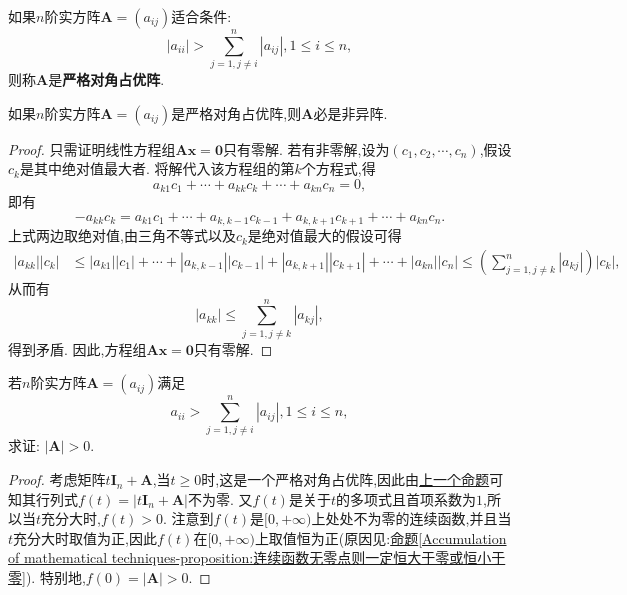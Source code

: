\documentclass[lang=cn,newtx,10pt,scheme=chinese]{elegantbook}
\begin{document}
\begin{definition}[严格对角占优阵]\label{definition:严格对角占优阵}
    如果\(n\)阶实方阵\(\boldsymbol{A}=(a_{ij})\)适合条件:
\[
|a_{ii}|>\sum_{j = 1,j\neq i}^{n}|a_{ij}|,1\leq i\leq n,
\]
则称\(\boldsymbol{A}\)是\textbf{严格对角占优阵}.
\end{definition}

\begin{proposition}[严格对角占优阵必是非异阵]\label{proposition:严格对角占优阵必是非异阵}
    如果\(n\)阶实方阵\(\boldsymbol{A}=(a_{ij})\)是严格对角占优阵,则\(\boldsymbol{A}\)必是非异阵.
\end{proposition}
\begin{proof}
只需证明线性方程组\(\boldsymbol{A}\boldsymbol{x}=\boldsymbol{0}\)只有零解. 若有非零解,设为\((c_1,c_2,\cdots,c_n)\),假设\(c_k\)是其中绝对值最大者. 将解代入该方程组的第\(k\)个方程式,得
\[
a_{k1}c_1+\cdots + a_{kk}c_k+\cdots + a_{kn}c_n = 0,
\]
即有
\[
-a_{kk}c_k=a_{k1}c_1+\cdots + a_{k,k - 1}c_{k - 1}+a_{k,k + 1}c_{k + 1}+\cdots + a_{kn}c_n.
\]
上式两边取绝对值,由三角不等式以及\(c_k\)是绝对值最大的假设可得
\begin{align*}
|a_{kk}||c_k|&\leq|a_{k1}||c_1|+\cdots + |a_{k,k - 1}||c_{k - 1}|+|a_{k,k + 1}||c_{k + 1}|+\cdots + |a_{kn}||c_n|\leq\left(\sum_{j = 1,j\neq k}^{n}|a_{kj}|\right)|c_k|,
\end{align*}
从而有
\[
|a_{kk}|\leq\sum_{j = 1,j\neq k}^{n}|a_{kj}|,
\]
得到矛盾. 因此,方程组\(\boldsymbol{A}\boldsymbol{x}=\boldsymbol{0}\)只有零解.
\end{proof}

\begin{proposition}\label{proposition:更严格对角占优阵行列式必大于零}
    若\(n\)阶实方阵\(\boldsymbol{A}=(a_{ij})\)满足
\[
a_{ii}>\sum_{j = 1,j\neq i}^{n}|a_{ij}|,1\leq i\leq n,
\]
求证: \(|\boldsymbol{A}|>0\).
\end{proposition}
\begin{proof}
    考虑矩阵\(t\boldsymbol{I}_n+\boldsymbol{A}\),当\(t\geq0\)时,这是一个严格对角占优阵,因此由\hyperref[proposition:严格对角占优阵必是非异阵]{上一个命题}可知其行列式\(f(t)=|t\boldsymbol{I}_n+\boldsymbol{A}|\)不为零. 又\(f(t)\)是关于\(t\)的多项式且首项系数为\(1\),所以当\(t\)充分大时,\(f(t)>0\). 注意到\(f(t)\)是\([0,+\infty)\)上处处不为零的连续函数,并且当\(t\)充分大时取值为正,因此\(f(t)\)在\([0,+\infty)\)上取值恒为正(原因见:\hyperref[Accumulation of mathematical techniques-proposition:连续函数无零点则一定恒大于零或恒小于零]{命题\ref{Accumulation of mathematical techniques-proposition:连续函数无零点则一定恒大于零或恒小于零}}). 特别地,\(f(0)=|\boldsymbol{A}|>0\).
\end{proof}
\end{document}
